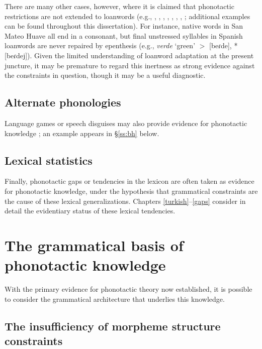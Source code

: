 There are many other cases, however, where it is claimed that phonotactic restrictions are not extended to loanwords (e.g., \citealt{Clements1982}, \citealt[75]{Davidson1997}, \citealt{Fries1949}, \citealt{Holden1976}, \citealt{Ito1995a,Ito1995b}, \citealt[95]{Shibatani1973}, \citealt{Ussishkin2003}, \citealt{Vogt1954}; additional examples can be found throughout this dissertation).
For instance, native words in San Mateo Huave all end in a consonant, but final unstressed syllables in Spanish loanwords are never repaired by epenthesis (e.g., \emph{verde} `green' $>$ [beɾde], *[beɾdej]).
Given the limited understanding of loanword adaptation at the present juncture, it may be premature to regard this inertness as strong evidence against the constraints in question, though it may be a useful diagnostic.

\subsection{Alternate phonologies}

Language games or speech disguises may also provide evidence for phonotactic knowledge \citep[e.g.,][]{Vaux2011}; an example appears in \S\ref{ss:bh} below.

\subsection{Lexical statistics}

Finally, phonotactic gaps or tendencies in the lexicon are often taken as evidence for phonotactic knowledge, under the hypothesis that grammatical constraints are the cause of these lexical generalizations.
Chapters \ref{turkish}--\ref{gaps} consider in detail the evidentiary status of these lexical tendencies.

\section{The grammatical basis of phonotactic knowledge}

With the primary evidence for phonotactic theory now established, it is possible to consider the grammatical architecture that underlies this knowledge.

\subsection{The insufficiency of morpheme structure constraints}

